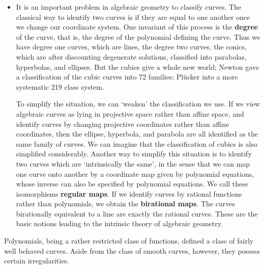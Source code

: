 \begin{itemize}
    \item It is an important problem in algebraic geometry to classify curves. The classical way to identify two curves is if they are equal to one another once we change our coordinate system. One invariant of this process is the {\bf degree} of the curve, that is, the degree of the polynomial defining the curve. Thus we have degree one curves, which are lines, the degree two curves, the conics, which are after discounting degenerate solutions, classified into parabolas, hyperbolas, and ellipses. But the cubics give a whole new world; Newton gave a classification of the cubic curves into 72 families; Pl\"{u}cker into a more systematic 219 class system.

    To simplify the situation, we can `weaken' the classification we use. If we view algebraic curves as lying in projective space rather than affine space, and identify curves by changing projective coordinates rather than affine coordinates, then the ellipse, hyperbola, and parabola are all identified as the same family of curves. We can imagine that the classification of cubics is also simplified considerably. Another way to simplify this situation is to identify two curves which are `intrinsically the same', in the sense that we can map one curve onto another by a coordinate map given by polynomial equations, whose inverse can also be specified by polynomial equations. We call these isomorphisms {\bf regular maps}. If we identify curves by rational functions rather than polynomials, we obtain the {\bf birational maps}. The curves birationally equivalent to a line are exactly the rational curves. These are the basic notions leading to the intrinsic theory of algebraic geometry.
\end{itemize}
%
Polynomials, being a rather restricted class of functions, defined a class of fairly well behaved curves. Aside from the class of smooth curves, however, they possess certain irregularities.
%
